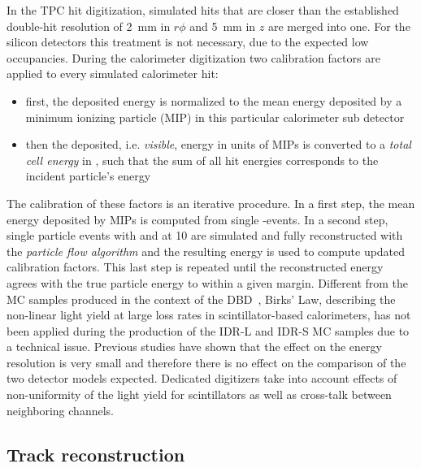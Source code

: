 In the TPC hit digitization, simulated hits that are closer than the established double-hit resolution
of 2~mm in $r\phi$ and 5~mm in $z$ are merged into one.
For the silicon detectors this treatment is not necessary, due to the expected low occupancies.
%
During the calorimeter digitization two calibration factors are applied to every simulated calorimeter hit:
\begin{itemize}
\item first, the deposited energy is normalized to the mean energy deposited by a minimum ionizing particle (MIP) in this particular calorimeter
  sub detector
\item  then the deposited, i.e. \emph{visible}, energy in units of MIPs is converted to a \emph{total cell energy} in \GeV, such that the
  sum of all hit energies corresponds to the incident particle's energy
\end{itemize}

The calibration of these factors is an iterative procedure. In a first step, the mean energy deposited by MIPs is computed from single \Pmuon-events.
In a second step, single particle events with \Pphoton and \PKzL at  \unit{10}{\GeV} are simulated and fully reconstructed with the \emph{particle flow algorithm}
and the resulting energy is used to compute updated calibration factors. This last step is repeated until the reconstructed energy agrees with the true particle
energy to within a given margin.
%
Different from the MC samples produced in the context of the DBD~\cite{Behnke:2013lya}, Birks' Law, describing the non-linear light yield at large loss rates in scintillator-based calorimeters, has not been applied during the production of the IDR-L and IDR-S MC samples due to a technical issue. Previous studies have shown that the effect on the energy resolution is very small and therefore there is no effect on the comparison of the two detector models expected.
Dedicated digitizers take into account
effects of non-uniformity of the light yield for scintillators as well as cross-talk between
neighboring channels.

\subsection{Track reconstruction}

